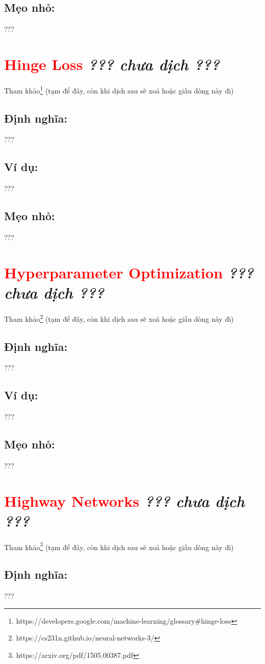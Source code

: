 \subsection*{Mẹo nhỏ:}
???
\section*{\huge \textcolor{Red}{Hinge Loss}  \small \textit{??? chưa dịch ???} }
Tham khảo\footnote{https://developers.google.com/machine-learning/glossary\#hinge-loss} (tạm để đây, còn khi dịch sau sẽ xoá hoặc giấu dòng này đi)
\subsection*{Định nghĩa:}
???
\subsection*{Ví dụ:}
???
\subsection*{Mẹo nhỏ:}
???
\section*{\huge \textcolor{Red}{Hyperparameter Optimization}  \small \textit{??? chưa dịch ???} }
Tham khảo\footnote{https://cs231n.github.io/neural-networks-3/} (tạm để đây, còn khi dịch sau sẽ xoá hoặc giấu dòng này đi)
\subsection*{Định nghĩa:}
???
\subsection*{Ví dụ:}
???
\subsection*{Mẹo nhỏ:}
???
\section*{\huge \textcolor{Red}{Highway Networks}  \small \textit{??? chưa dịch ???} }
Tham khảo\footnote{https://arxiv.org/pdf/1505.00387.pdf} (tạm để đây, còn khi dịch sau sẽ xoá hoặc giấu dòng này đi)
\subsection*{Định nghĩa:}
???
